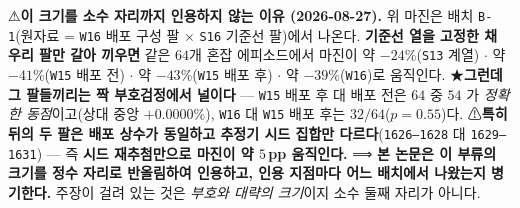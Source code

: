 \documentclass[11pt]{report}
\numberwithin{equation}{chapter}
\numberwithin{figure}{chapter}
\numberwithin{table}{chapter}
\begin{document}
%
⚠\textbf{이 크기를 소수 자리까지 인용하지 않는 이유 (2026-08-27).}
위 마진은 배치 \texttt{B-1}(원자료 = \texttt{W16} 배포 구성 팔 $\times$ \texttt{S16}
기준선 팔)에서 나온다. \textbf{기준선 열을 고정한 채 우리 팔만 갈아 끼우면} 같은 $64$개
혼잡 에피소드에서 마진이 약 $-24\%$(\texttt{S13} 계열) $\cdot$ 약 $-41\%$(\texttt{W15}
배포 전) $\cdot$ 약 $-43\%$(\texttt{W15} 배포 후) $\cdot$ 약 $-39\%$(\texttt{W16})로
움직인다. ★\textbf{그런데 그 팔들끼리는 짝 부호검정에서 널이다} --- \texttt{W15} 배포
후 대 배포 전은 $64$ 중 $54$ 가 \emph{정확한 동점}이고(상대 중앙 $+0.0000\%$),
\texttt{W16} 대 \texttt{W15} 배포 후는 $32/64$($p = 0.55$)다. ⚠\textbf{특히 뒤의 두 팔은
배포 상수가 동일하고 추정기 시드 집합만 다르다}(\texttt{1626--1628} 대
\texttt{1629--1631}) --- 즉 \textbf{시드 재추첨만으로 마진이 약 $5$\,pp 움직인다.}
⟹ \textbf{본 논문은 이 부류의 크기를 정수 자리로 반올림하여 인용하고, 인용 지점마다
어느 배치에서 나왔는지 병기한다.} 주장이 걸려 있는 것은 \emph{부호와 대략의 크기}이지
소수 둘째 자리가 아니다.
\end{document}

